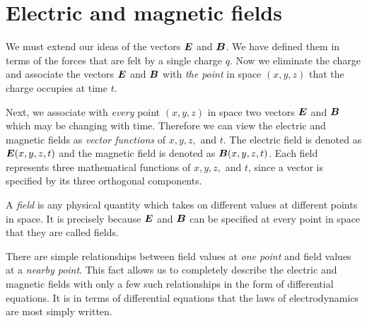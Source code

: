 \section{Electric and magnetic fields}

We must extend our ideas of the vectors $\boldsymbol{E}$ and $\boldsymbol{B}$.
We have defined them in terms of the forces that are felt by a single charge $q$.
Now we eliminate the charge and associate the vectors $\boldsymbol{E}$ and $\boldsymbol{B}$
with \emph{the point} in space $(x, y, z)$ that the charge occupies at time $t$.

Next, we associate with \emph{every} point $(x, y, z)$ in space 
two vectors $\boldsymbol{E}$ and $\boldsymbol{B}$ which may be changing with time.
Therefore we can view the electric and magnetic fields 
as \emph{vector functions} of $x, y, z,$ and $t$.
The electric field is denoted as $\boldsymbol{E}(x, y, z, t)$ and 
the magnetic field is denoted as $\boldsymbol{B}(x, y, z, t)$.
Each field represents three mathematical functions of $x, y, z,$ and $t$,
since a vector is specified by its three orthogonal components.

A \emph{field} is any physical quantity which takes on different values
at different points in space.
It is precisely because $\boldsymbol{E}$ and $\boldsymbol{B}$ can be specified at every point in space
that they are called fields.

There are simple relationships between field values at \emph{one point}
and field values at a \emph{nearby point}.
This fact allows us to completely describe the electric and magnetic fields
with only a few such relationships in the form of differential equations.
It is in terms of differential equations that the laws of electrodynamics
are most simply written.

